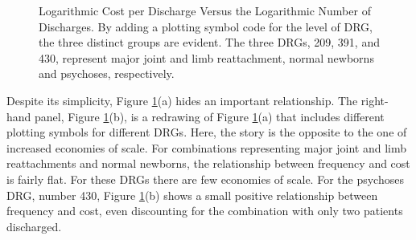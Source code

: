 \begin{figure}[htp]
  \begin{center}  \hfill
    \caption{\label{F21:PlotsLogCostDischarge} \small Logarithmic Cost per Discharge Versus the Logarithmic Number of
Discharges. By adding a plotting symbol code for the level of DRG,
the three distinct groups are evident. The three DRGs, 209, 391, and
430, represent major joint and limb reattachment, normal newborns
and psychoses, respectively.}
  \end{center}
\end{figure}


Despite its simplicity, Figure \ref{F21:PlotsLogCostDischarge}(a)
hides an important relationship. The right-hand panel, Figure
\ref{F21:PlotsLogCostDischarge}(b), is a redrawing of Figure
\ref{F21:PlotsLogCostDischarge}(a) that includes different plotting
symbols for different DRGs. Here, the story is the opposite to the
one of increased economies of scale. For combinations representing
major joint and limb reattachments and normal newborns, the
relationship between frequency and cost is fairly flat. For these
DRGs there are few economies of scale. For the psychoses DRG, number
430, Figure \ref{F21:PlotsLogCostDischarge}(b) shows a small
positive relationship between frequency and cost, even discounting
for the combination with only two patients discharged.

